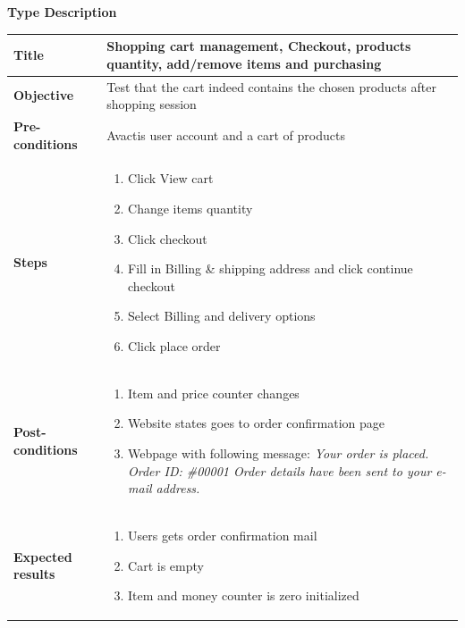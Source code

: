 \documentclass[UKenglish,12pt]{article}
\begin{document}
\begin{enumerate}
\newpage
\textbf{\hspace{0.3cm}Type\hspace{4.4cm} Description}
\newline \vspace{0.2cm}
\begin{tabular}{| p{5cm} | p{10cm} | }
	\hline
	 \textbf{Title} & Shopping cart management, Checkout, products quantity, add/remove items and purchasing \\ \hline
	 \textbf{Objective} & Test that the cart indeed contains the chosen products after shopping session \\ \hline
	 \textbf{Pre-conditions} & Avactis user account and a cart of products \\ \hline
	 \textbf{Steps} & \begin{enumerate} \item Click View cart \item Change items quantity \item Click checkout \item Fill in Billing \& shipping address and click continue checkout \item Select Billing and delivery options \item Click place order
	 \end{enumerate} \\ \hline
	\textbf{Post-conditions} & \begin{enumerate}\item Item and price counter changes \item Website states goes to order confirmation page \item Webpage with following message: \textit{Your order is placed. Order ID: \#00001 Order details have been sent to your e-mail address.}  \end{enumerate} \\ \hline
	 \textbf{Expected results} & \begin{enumerate}\item Users gets order confirmation mail \item Cart is empty \item Item and money counter is zero initialized \end{enumerate}\\ 
	 \hline
\end{tabular} %



\end{enumerate}
\end{document}
